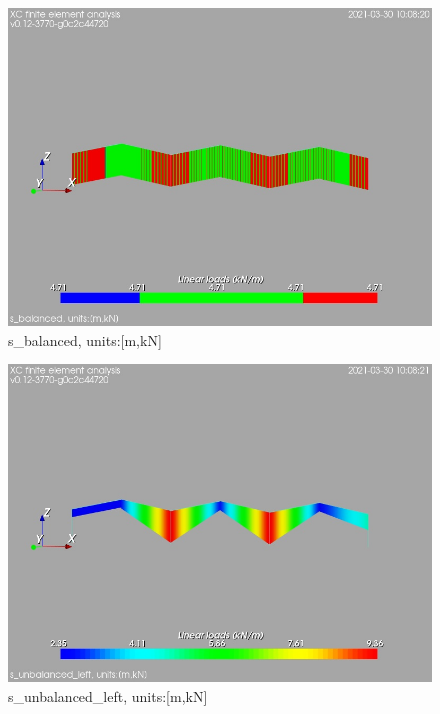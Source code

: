 \begin{figure}
\begin{center}
\includegraphics[width=\linewidth]{calc_results/sole_zeinali/text/graphics/loads/s_balancedallMemberSet}
\caption{s_balanced, units:[m,kN]}
\label{s-balanced-unitsmkn}
\end{center}
\end{figure}
\begin{figure}
\begin{center}
\includegraphics[width=\linewidth]{calc_results/sole_zeinali/text/graphics/loads/s_unbalanced_leftallMemberSet}
\caption{s_unbalanced_left, units:[m,kN]}
\label{s-unbalanced-left-unitsmkn}
\end{center}
\end{figure}

